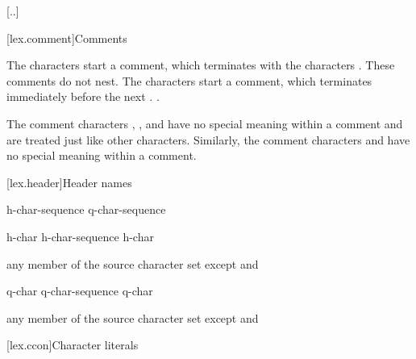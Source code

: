 \documentclass{wg21}
\begin{document}
[..]

[lex.comment]{Comments}

\pnum
{}%
%
%
The characters \tcode{/*} start a comment, which terminates with the
characters \tcode{*/}. These comments do not nest.
%
The characters \tcode{//} start a comment, which terminates immediately before the
next . .
\begin{note}
    The comment characters \tcode{//}, \tcode{/*},
    and \tcode{*/} have no special meaning within a \tcode{//} comment and
    are treated just like other characters. Similarly, the comment
    characters \tcode{//} and \tcode{/*} have no special meaning within a
    \tcode{/*} comment.
\end{note}

[lex.header]{Header names}

%
\begin{bnf}
    \br
    \terminal{<} h-char-sequence \terminal{>}\br
     q-char-sequence 
\end{bnf}

\begin{bnf}
    \br
    h-char\br
    h-char-sequence h-char
\end{bnf}

\begin{bnf}
    \br
    \textnormal{any member of the source character set except  and \terminal{>}}
\end{bnf}

\begin{bnf}
    \br
    q-char\br
    q-char-sequence q-char
\end{bnf}

\begin{bnf}
    \br
    \textnormal{any member of the source character set except  and }
\end{bnf}


[lex.ccon]{Character literals}
\end{document}
